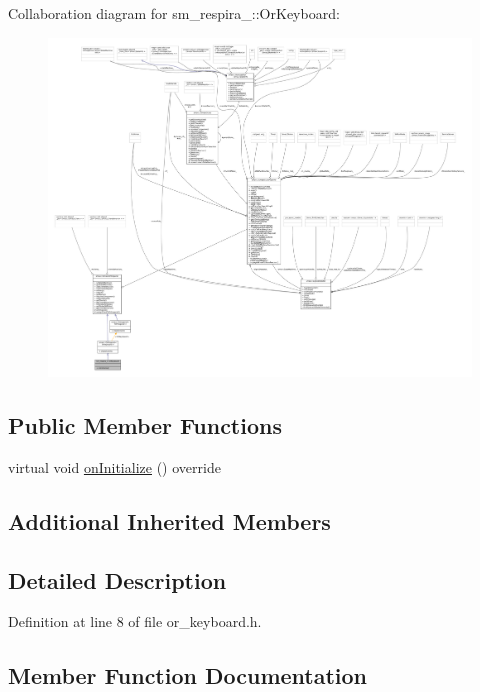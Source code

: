 Collaboration diagram for sm\+\_\+respira\+\_\+:\+:Or\+Keyboard\+:
\nopagebreak
\begin{figure}[H]
\begin{center}
\leavevmode
\includegraphics[width=350pt]{classsm__respira__1_1_1OrKeyboard__coll__graph}
\end{center}
\end{figure}
\subsection*{Public Member Functions}
\begin{DoxyCompactItemize}
\item 
virtual void \hyperlink{classsm__respira__1_1_1OrKeyboard_a621b08a13f8165f7e17aacaf1fb9e29a}{on\+Initialize} () override
\end{DoxyCompactItemize}
\subsection*{Additional Inherited Members}


\subsection{Detailed Description}


Definition at line 8 of file or\+\_\+keyboard.\+h.



\subsection{Member Function Documentation}
\mbox{\label{classsm__respira__1_1_1OrKeyboard_a621b08a13f8165f7e17aacaf1fb9e29a}} 
